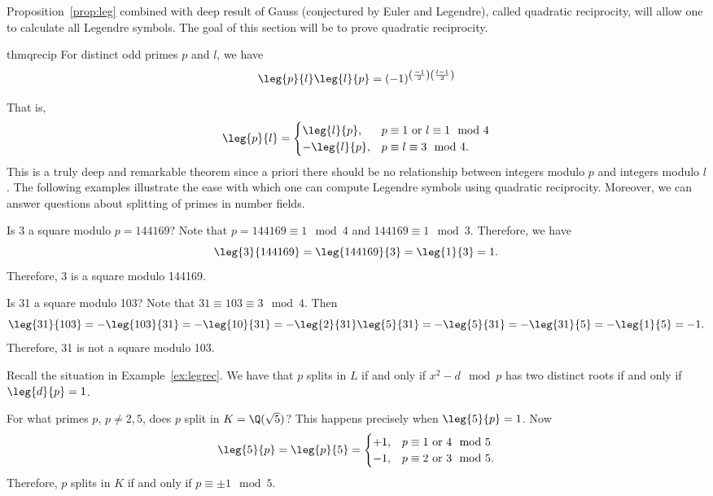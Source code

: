Proposition~\ref{prop:leg} combined with deep result of Gauss (conjectured by Euler and Legendre), called quadratic reciprocity, will allow one to calculate all Legendre symbols. The goal of this section will be to prove quadratic reciprocity. 

\begin{restatable*}{thm}{qrecip} \label{thm:qreciprocity}
For distinct odd primes $p$ and $l$, we have
	\[
	\leg{p}{l} \leg{l}{p} = (-1)^{\left(\frac{-1}{2}\right)\left(\frac{l-1}{2}\right)}
	\]
\end{restatable*}

That is, 
	\[
	\leg{p}{l}= 
	\begin{cases} 
	\leg{l}{p}, & p \equiv 1 \text{ or } l \equiv 1 \mod 4 \\ 
	- \leg{l}{p}, & p \equiv l \equiv 3 \mod 4 .
	\end{cases}
	\]
 This is a truly deep and remarkable theorem since a priori there should be no relationship between integers modulo $p$ and integers modulo $l$. The following examples illustrate the ease with which one can compute Legendre symbols using quadratic reciprocity. Moreover, we can answer questions about splitting of primes in number fields.


\begin{ex}
Is 3 a square modulo $p=144169$? Note that $p=144169 \equiv 1 \mod 4$ and $144169 \equiv 1 \mod 3$. Therefore, we have
	\[
	\leg{3}{144169} = \leg{144169}{3}= \leg{1}{3}=1.
	\]
Therefore, 3 is a square modulo 144169. \xqed
\end{ex} 


\begin{ex}
Is 31 a square modulo 103? Note that $31 \equiv 103 \equiv 3 \mod 4$. Then
	\[
	\leg{31}{103} = - \leg{103}{31}= - \leg{10}{31}= - \leg{2}{31} \leg{5}{31}= - \leg{5}{31}= - \leg{31}{5}= - \leg{1}{5}= -1.
	\]
Therefore, 31 is not a square modulo 103. \xqed
\end{ex}


\begin{ex}
Recall the situation in Example~\ref{ex:legrec}. We have that $p$ splits in $L$ if and only if $x^2-d \mod p$ has two distinct roots if and only if $\leg{d}{p}=1$. \xqed
\end{ex}

\begin{ex}
For what primes $p$, $p \neq 2,5$, does $p$ split in $K=\Q(\sqrt{5})$? This happens precisely when $\leg{5}{p}=1$. Now
	\[
	\leg{5}{p}= \leg{p}{5}= 
	\begin{cases}
	+1, & p \equiv 1 \text{ or }4 \mod 5 \\
	-1, & p \equiv 2 \text{ or }3 \mod 5.
	\end{cases}
	\]
Therefore, $p$ splits in $K$ if and only if $p \equiv \pm 1 \mod 5$. \xqed
\end{ex}


